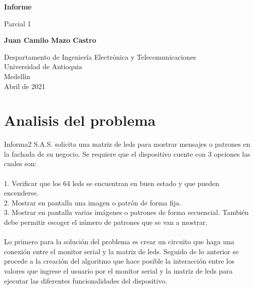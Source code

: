 \documentclass{article}
\begin{document}
\begin{titlepage}
    \begin{center}
        \vspace*{1cm}
            
        \Huge
        \textbf{Informe}
            
        \vspace{0.5cm}
        \LARGE
        Parcial 1
            
        \vspace{1.5cm}
            
        \textbf{Juan Camilo Mazo Castro}
            
        \vfill
            
        \vspace{0.8cm}
            
        \Large
        Despartamento de Ingeniería Electrónica y Telecomunicaciones\\
        Universidad de Antioquia\\
        Medellín\\
        Abril de 2021
            
    \end{center}
\end{titlepage}

\tableofcontents
\newpage
\section{Analisis del problema}\label{intro}
Informa2 S.A.S. solicita una matriz de leds para mostrar mensajes o patrones en la fachada de su negocio. Se requiere que el dispositivo cuente con 3 opciones las cuales son:\\\\
1.	Verificar que los 64 leds se encuentran en buen estado y que pueden encenderse.\\
2.	Mostrar en pantalla una imagen o patrón de forma fija.\\
3.	Mostrar en pantalla varias imágenes o patrones de forma secuencial. También debe permitir escoger el número de patrones que se van a mostrar.\\\\
Lo primero para la solución del problema es crear un circuito que haga una conexión entre el monitor serial y la matriz de leds. Seguido de lo anterior se procede a la creación del algoritmo que hace posible la interacción entre los valores que ingrese el usuario por el monitor serial y la matriz de leds para ejecutar las diferentes funcionalidades del dispositivo.\\\\
\end{document}
